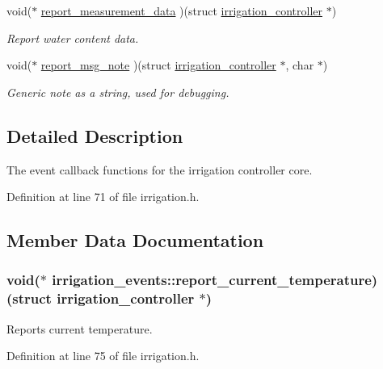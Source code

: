 \begin{DoxyCompactItemize}
void($\ast$ \hyperlink{structirrigation__events_add396df12f986fff177801aa022c35f2}{report\+\_\+measurement\+\_\+data} )(struct \hyperlink{structirrigation__controller}{irrigation\+\_\+controller} $\ast$)
\begin{DoxyCompactList}\small\item\em Report water content data. \end{DoxyCompactList}\item 
void($\ast$ \hyperlink{structirrigation__events_aeaa45961cfef7d031a086b2176f4c9a8}{report\+\_\+msg\+\_\+note} )(struct \hyperlink{structirrigation__controller}{irrigation\+\_\+controller} $\ast$, char $\ast$)
\begin{DoxyCompactList}\small\item\em Generic note as a string, used for debugging. \end{DoxyCompactList}\end{DoxyCompactItemize}


\subsection{Detailed Description}
The event callback functions for the irrigation controller core. 

Definition at line 71 of file irrigation.\+h.



\subsection{Member Data Documentation}
\hypertarget{structirrigation__events_a47b81edd52377b4c4e1ed512b830e237}{}
\subsubsection[{report\+\_\+current\+\_\+temperature}]{\setlength{\rightskip}{0pt plus 5cm}void($\ast$ irrigation\+\_\+events\+::report\+\_\+current\+\_\+temperature) (struct {\bf irrigation\+\_\+controller} $\ast$)}\label{structirrigation__events_a47b81edd52377b4c4e1ed512b830e237}


Reports current temperature. 



Definition at line 75 of file irrigation.\+h.

